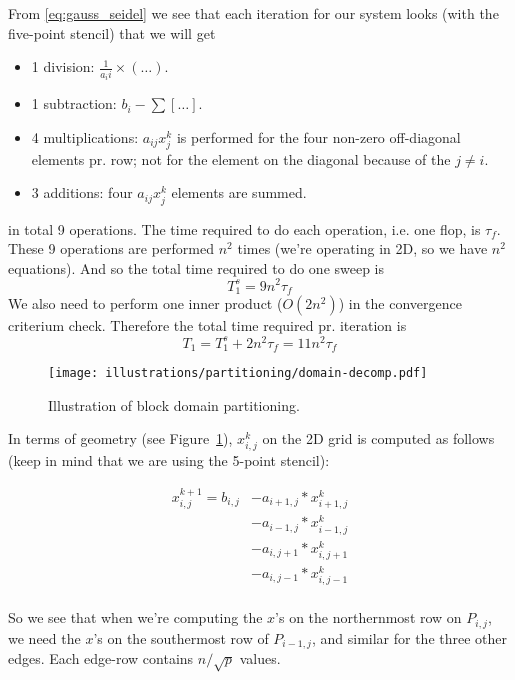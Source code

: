 From \eqref{eq:gauss_seidel} we see that each iteration for our system looks (with the five-point stencil) that we will get
\begin{itemize}
  \item 1 division: $\frac{1}{a_ii}\times(\dots)$.
  \item 1 subtraction: $b_i - \sum[\dots]$.
  \item 4 multiplications: $a_{ij}x_j^k$ is performed for the four non-zero off-diagonal elements pr. row; not for the element on the diagonal because of the $j\neq i$.
  \item 3 additions: four $a_{ij}x_j^k$ elements are summed.
\end{itemize}
in total 9 operations. The time required to do each operation, i.e. one flop, is $\tau_f$. These 9 operations are performed $n^2$ times (we're operating in 2D, so we have $n^2$ equations). And so the total time required to do one sweep is
\begin{equation}
  T_1^s = 9n^2\tau_f
\end{equation}
We also need to perform one inner product ($O(2n^2)$) in the convergence criterium check. Therefore the total time required pr. iteration is
\begin{equation}
  T_1 = T_1^s + 2n^2 \tau_f = 11n^2 \tau_f
\end{equation}

\begin{figure}[H]
  \centering
  \texttt{[image: illustrations/partitioning/domain-decomp.pdf]}
  \caption{Illustration of block domain partitioning.}
  \label{fig:2013_domain_decomp}
\end{figure}

In terms of geometry (see Figure~\ref{fig:2013_domain_decomp}), $x_{i,j}^k$  on the 2D grid is computed as follows (keep in mind that we are using the 5-point stencil):

\begin{align*}
    x_{i,j}^{k+1} = b_{i,j} &- a_{i+1,j} * x_{i+1,j}^k \\
                            &- a_{i-1,j} * x_{i-1,j}^k \\
                            &- a_{i,j+1} * x_{i,j+1}^k \\
                            &- a_{i,j-1} * x_{i,j-1}^k \\
\end{align*}

So we see that when we're computing the $x$'s on the northernmost row on $P_{i,j}$, we need the $x$'s on the southermost row of $P_{i-1,j}$, and similar for the three other edges. Each edge-row contains $n/\sqrt{p}$ values.

